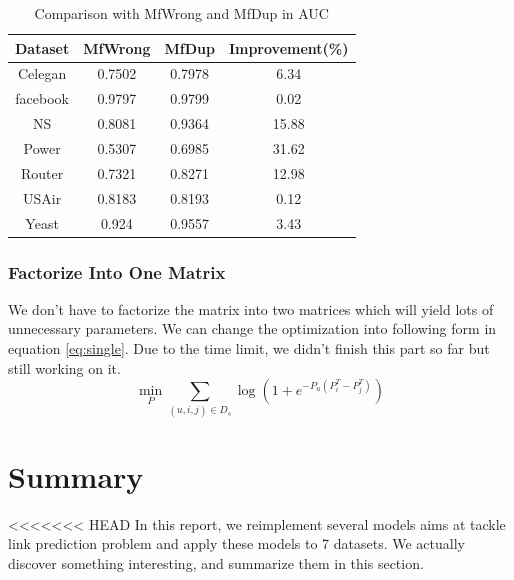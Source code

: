 \documentclass[12pt]{article}
\begin{document}
\begin{table}
	\begin{center}
		\begin{tabular}{|c|c|c|c|}
			\hline
			Dataset & MfWrong & MfDup & Improvement(\%) \\
			\hline
			Celegan&0.7502&0.7978&6.34\\
			facebook&0.9797&0.9799&0.02\\
			NS&0.8081&0.9364&15.88\\
			Power&0.5307&0.6985&31.62\\
			Router&0.7321&0.8271&12.98\\
			USAir&0.8183&0.8193&0.12\\
			Yeast&0.924&0.9557&3.43\\
			\hline
		\end{tabular}
	\end{center}
	\caption{Comparison with MfWrong and MfDup in AUC}
	\label{tab:dup}
\end{table}

\subsubsection{Factorize Into One Matrix}
We don't have to factorize the matrix into two matrices which will yield lots of unnecessary parameters. We can change the optimization into following form in equation \ref{eq:single}. Due to the time limit, we didn't finish this part so far but still working on it.
\begin{equation}
\min_{P} \sum_{(u,i,j)\in D_s}\log(1+e^{-P_u(P_i^T - P_j^T)})
\label{eq:single}
\end{equation}

\section{Summary}
<<<<<<< HEAD
In this report, we reimplement several models aims at tackle link prediction problem and apply these models to 7 datasets. We actually discover something interesting, and summarize them in this section.
\end{document}
